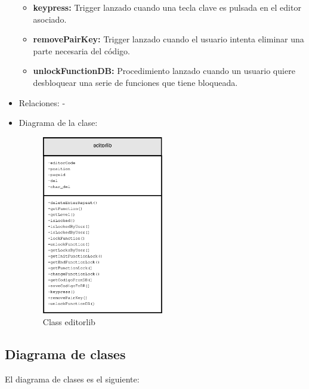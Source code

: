 \begin{itemize}
\begin{itemize}
			\item \textbf{keypress:} Trigger lanzado cuando una tecla clave es pulsada en el editor asociado.
			\item \textbf{removePairKey:} Trigger lanzado cuando el usuario intenta eliminar una parte necesaria del código.
			\item \textbf{unlockFunctionDB:} Procedimiento lanzado cuando un usuario quiere desbloquear una serie de funciones que tiene bloqueada.		
		\end{itemize}
	\item Relaciones: -
	\item Diagrama de la clase:
		\begin{figure}[h]
			\centering
			\includegraphics[width=0.5\textwidth]{./img/editorlib.eps}
			\caption{Class editorlib}
		\end{figure}
\end{itemize}

\newpage

\subsection{Diagrama de clases}

El diagrama de clases es el siguiente:

